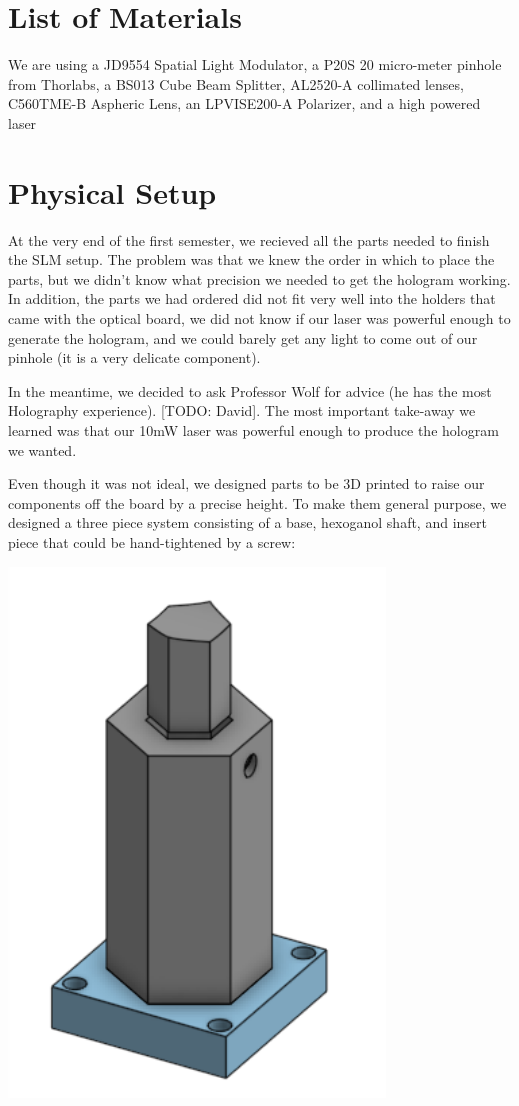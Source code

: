 \documentclass[12pt]{article}
\begin{document}
\section{List of Materials}

We are using a JD9554 Spatial Light Modulator, a P20S 20 micro-meter pinhole from Thorlabs, a BS013 Cube Beam Splitter, AL2520-A collimated lenses, C560TME-B Aspheric Lens, an LPVISE200-A Polarizer, and a high powered laser

\section{Physical Setup}
At the very end of the first semester, we recieved all the parts needed to finish the SLM setup. The problem was that we knew the order in which to place the parts, but we didn't know what precision we needed to get the hologram working. In addition, the parts we had ordered did not fit very well into the holders that came with the optical board, we did not know if our laser was powerful enough to generate the hologram, and we could barely get any light to come out of our pinhole (it is a very delicate component).

In the meantime, we decided to ask Professor Wolf for advice (he has the most Holography experience). [TODO: David]. The most important take-away we learned was that our 10mW laser was powerful enough to produce the hologram we wanted.

Even though it was not ideal, we designed parts to be 3D printed to raise our components off the board by a precise height. To make them general purpose, we designed a three piece system consisting of a base, hexoganol shaft, and insert piece that could be hand-tightened by a screw:

\begin{center}
\includegraphics[width=100mm]{holder.png}
\end{center}
\end{document}
